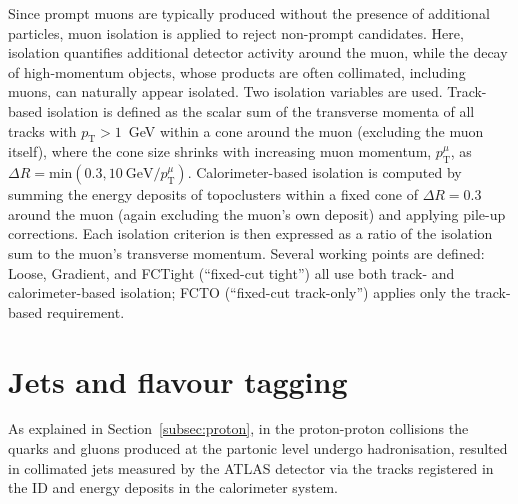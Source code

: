 Since prompt muons are typically produced without the presence of additional particles, muon isolation is applied to reject non-prompt candidates. Here, isolation quantifies additional detector activity around the muon, while the decay of high-momentum objects, whose products are often collimated, including muons, can naturally appear isolated.
Two isolation variables are used. Track-based isolation is defined as the scalar sum of the transverse momenta of all tracks with $p_{\text{T}}>1$~GeV within a cone around the muon (excluding the muon itself), where the cone size shrinks with increasing muon momentum, $p^{\mu}_{\text{T}}$, as $\Delta R = \text{min}(0.3, 10~\text{GeV}/p^{\mu}_{\text{T}})$.
Calorimeter-based isolation is computed by summing the energy deposits of topoclusters within a fixed cone of $\Delta R=0.3$ around the muon (again excluding the muon’s own deposit) and applying pile-up corrections. Each isolation criterion is then expressed as a ratio of the isolation sum to the muon’s transverse momentum.
Several working points are defined: Loose, Gradient, and FCTight (“fixed-cut tight”) all use both track- and calorimeter-based isolation; FCTO (“fixed-cut track-only”) applies only the track-based requirement.

\section{Jets and flavour tagging}
\label{sec:jets}
As explained in Section~\ref{subsec:proton}, in the proton-proton collisions the quarks and gluons produced at the partonic level undergo hadronisation, resulted in collimated jets measured by the ATLAS detector via the tracks registered in the ID and energy deposits in the calorimeter system. 

